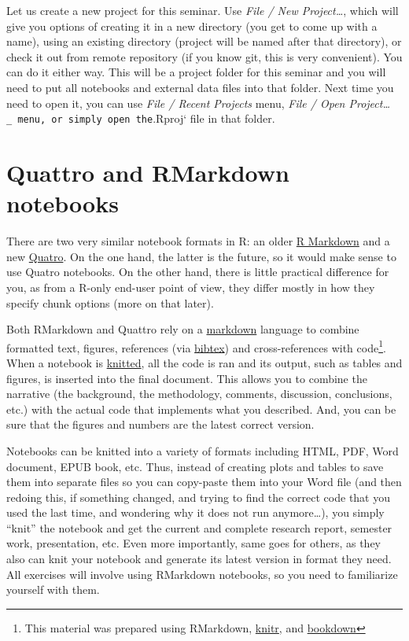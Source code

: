 \documentclass[
]{book}
\begin{document}
Let us create a new project for this seminar. Use \emph{File / New Project\ldots{}}, which will give you options of creating it in a new directory (you get to come up with a name), using an existing directory (project will be named after that directory), or check it out from remote repository (if you know git, this is very convenient). You can do it either way. This will be a project folder for this seminar and you will need to put all notebooks and external data files into that folder. Next time you need to open it, you can use \emph{File / Recent Projects} menu, \emph{File / Open Project\ldots{}}\texttt{\_\ menu,\ or\ simply\ open\ the}.Rproj` file in that folder.

\hypertarget{rmarkdown}{%
\section{Quattro and RMarkdown notebooks}\label{rmarkdown}}

There are two very similar notebook formats in R: an older \href{https://rmarkdown.rstudio.com/}{R Markdown} and a new \href{https://quarto.org/}{Quatro}. On the one hand, the latter is the future, so it would make sense to use Quatro notebooks. On the other hand, there is little practical difference for you, as from a R-only end-user point of view, they differ mostly in how they specify chunk options (more on that later).

Both RMarkdown and Quattro rely on a \href{https://rmarkdown.rstudio.com/}{markdown} language to combine formatted text, figures, references (via \href{http://www.bibtex.org/}{bibtex}) and cross-references with code\footnote{This material was prepared using RMarkdown, \href{(https://yihui.org/knitr/)}{knitr}, and \href{https://bookdown.org/}{bookdown}}. When a notebook is \href{https://yihui.org/knitr/}{knitted}, all the code is ran and its output, such as tables and figures, is inserted into the final document. This allows you to combine the narrative (the background, the methodology, comments, discussion, conclusions, etc.) with the actual code that implements what you described. And, you can be sure that the figures and numbers are the latest correct version.

Notebooks can be knitted into a variety of formats including HTML, PDF, Word document, EPUB book, etc. Thus, instead of creating plots and tables to save them into separate files so you can copy-paste them into your Word file (and then redoing this, if something changed, and trying to find the correct code that you used the last time, and wondering why it does not run anymore\ldots), you simply ``knit'' the notebook and get the current and complete research report, semester work, presentation, etc. Even more importantly, same goes for others, as they also can knit your notebook and generate its latest version in format they need. All exercises will involve using RMarkdown notebooks, so you need to familiarize yourself with them.
\end{document}
